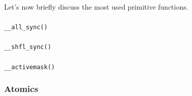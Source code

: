 \documentclass[12pt]{article}
\begin{document}
Let's now briefly discuss the most used primitive functions.

\paragraph{}\verb|__all_sync()|
\paragraph{}\verb|__shfl_sync()|
\paragraph{}\verb|__activemask()|

\subsubsection*{Atomics}













%
%
%
%
%
%
%
%
%
%
%
%
\end{document}
